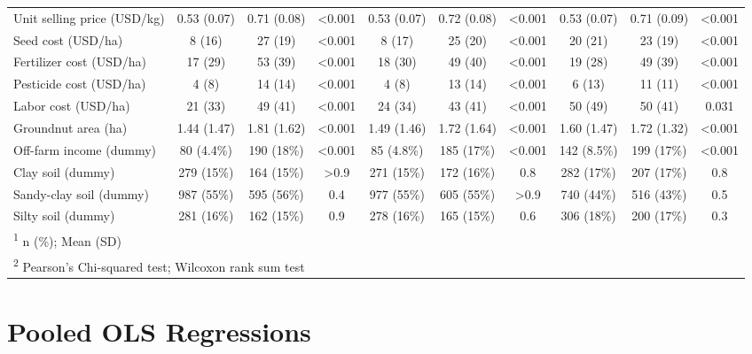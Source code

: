 \documentclass[
]{article}
\begin{document}
\begin{landscape}
\begin{table}[!h]
{\begin{tabular}[t]{lccccccccc}
Unit selling price (USD/kg) & 0.53 (0.07) & 0.71 (0.08) & <0.001 & 0.53 (0.07) & 0.72 (0.08) & <0.001 & 0.53 (0.07) & 0.71 (0.09) & <0.001\\
Seed cost (USD/ha) & 8 (16) & 27 (19) & <0.001 & 8 (17) & 25 (20) & <0.001 & 20 (21) & 23 (19) & <0.001\\
Fertilizer cost (USD/ha) & 17 (29) & 53 (39) & <0.001 & 18 (30) & 49 (40) & <0.001 & 19 (28) & 49 (39) & <0.001\\
Pesticide cost (USD/ha) & 4 (8) & 14 (14) & <0.001 & 4 (8) & 13 (14) & <0.001 & 6 (13) & 11 (11) & <0.001\\
\addlinespace
Labor cost (USD/ha) & 21 (33) & 49 (41) & <0.001 & 24 (34) & 43 (41) & <0.001 & 50 (49) & 50 (41) & 0.031\\
Groundnut area (ha) & 1.44 (1.47) & 1.81 (1.62) & <0.001 & 1.49 (1.46) & 1.72 (1.64) & <0.001 & 1.60 (1.47) & 1.72 (1.32) & <0.001\\
Off-farm income (dummy) & 80 (4.4\%) & 190 (18\%) & <0.001 & 85 (4.8\%) & 185 (17\%) & <0.001 & 142 (8.5\%) & 199 (17\%) & <0.001\\
Clay soil (dummy) & 279 (15\%) & 164 (15\%) & >0.9 & 271 (15\%) & 172 (16\%) & 0.8 & 282 (17\%) & 207 (17\%) & 0.8\\
Sandy-clay soil (dummy) & 987 (55\%) & 595 (56\%) & 0.4 & 977 (55\%) & 605 (55\%) & >0.9 & 740 (44\%) & 516 (43\%) & 0.5\\
\addlinespace
Silty soil (dummy) & 281 (16\%) & 162 (15\%) & 0.9 & 278 (16\%) & 165 (15\%) & 0.6 & 306 (18\%) & 200 (17\%) & 0.3\\
\bottomrule
\multicolumn{10}{l}{\rule{0pt}{1em}\textsuperscript{1} n (\%); Mean (SD)}\\
\multicolumn{10}{l}{\rule{0pt}{1em}\textsuperscript{2} Pearson's Chi-squared test; Wilcoxon rank sum test}\\
\end{tabular}}
\end{table}
\end{landscape}
\newpage

\hypertarget{pooled-ols-regressions}{%
\section{Pooled OLS Regressions}\label{pooled-ols-regressions}}

\begingroup\fontsize{7}{9}\selectfont
\end{document}
